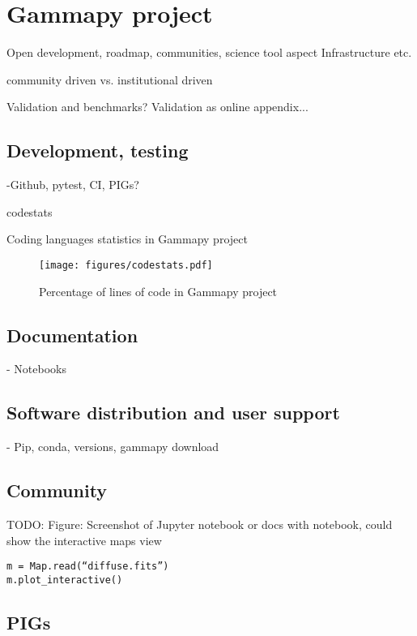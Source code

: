 \section{Gammapy project}
\label{sec:gammapy-project}

Open development, roadmap, communities, science tool aspect Infrastructure etc.

community driven vs. institutional driven

Validation and benchmarks? Validation as online appendix...

\subsection{Development, testing}
\label{ssec:development-testing}
-Github, pytest, CI, PIGs?

\begin{table}
	{codestats}
	\caption{Coding languages statistics in Gammapy project}
	\label{table:codestats:data}
\end{table}

\begin{figure}[t]
	\centering
	\texttt{[image: figures/codestats.pdf]}
    \caption{
        Percentage of lines of code in Gammapy project
    }
	\label{fig:codestats:lang}
\end{figure}

\subsection{Documentation}
\label{ssec:documentation}

- Notebooks

\subsection{Software distribution and user support}
\label{ssec:software-distribution-and-user-support}
- Pip, conda, versions, gammapy download

\subsection{Community}
\label{ssec:community}
TODO: Figure: Screenshot of Jupyter notebook or docs with notebook, could show
the interactive maps view
\begin{verbatim}
m = Map.read(“diffuse.fits”)
m.plot_interactive()
\end{verbatim}

\subsection{PIGs}
\label{ssec:pigs}
